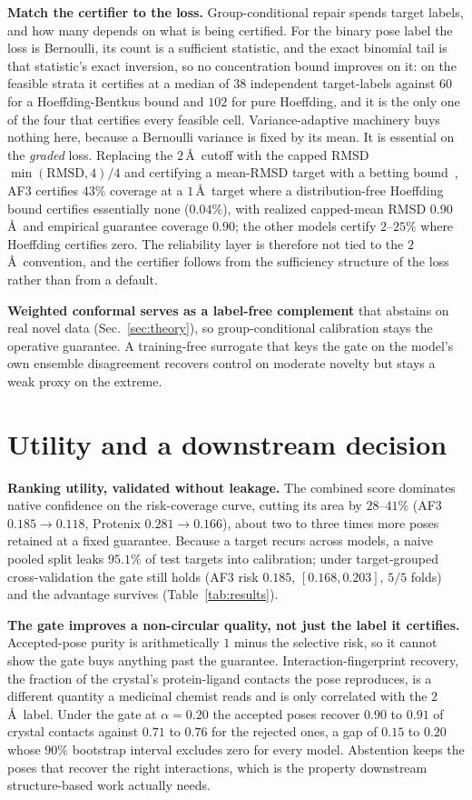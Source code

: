 \documentclass[10pt]{article}
\begin{document}
\textbf{Match the certifier to the loss.} Group-conditional repair spends target labels, and how
many depends on what is being certified. For the binary pose label the loss is Bernoulli, its count
is a sufficient statistic, and the exact binomial tail is that statistic's exact inversion, so no
concentration bound improves on it: on the feasible strata it certifies at a median of $38$
independent target-labels against $60$ for a Hoeffding-Bentkus bound and $102$ for pure Hoeffding,
and it is the only one of the four that certifies every feasible cell. Variance-adaptive machinery
buys nothing here, because a Bernoulli variance is fixed by its mean. It is essential on the
\emph{graded} loss. Replacing the $2$\,\AA\ cutoff with the capped RMSD $\min(\mathrm{RMSD},4)/4$ and
certifying a mean-RMSD target with a betting bound~\citep{waudbysmith2024betting}, AF3 certifies
$43\%$ coverage at a $1$\,\AA\ target where a distribution-free Hoeffding bound certifies essentially
none ($0.04\%$), with realized capped-mean RMSD $0.90$\,\AA\ and empirical guarantee coverage $0.90$;
the other models certify $2$--$25\%$ where Hoeffding certifies zero. The reliability layer is
therefore not tied to the $2$\,\AA\ convention, and the certifier follows from the sufficiency
structure of the loss rather than from a default.

\textbf{Weighted conformal serves as a label-free complement} that abstains on real novel data
(Sec.~\ref{sec:theory}), so group-conditional calibration stays the operative guarantee. A
training-free surrogate that keys the gate on the model's own ensemble disagreement recovers control
on moderate novelty but stays a weak proxy on the extreme.

\section{Utility and a downstream decision}\label{sec:screen}
\textbf{Ranking utility, validated without leakage.} The combined score dominates native
confidence on the risk-coverage curve, cutting its area by $28$--$41\%$ (AF3
$0.185\!\to\!0.118$, Protenix $0.281\!\to\!0.166$), about two to three times more poses
retained at a fixed guarantee. Because a target recurs across models, a naive pooled split
leaks $95.1\%$ of test targets into calibration; under target-grouped cross-validation the gate
still holds (AF3 risk $0.185$, $[0.168,0.203]$, $5/5$ folds) and the advantage survives
(Table~\ref{tab:results}).

\textbf{The gate improves a non-circular quality, not just the label it certifies.} Accepted-pose
purity is arithmetically $1$ minus the selective risk, so it cannot show the gate buys anything past
the guarantee. Interaction-fingerprint recovery, the fraction of the crystal's protein-ligand
contacts the pose reproduces, is a different quantity a medicinal chemist reads and is only
correlated with the $2$\,\AA\ label. Under the gate at $\alpha=0.20$ the accepted poses recover $0.90$
to $0.91$ of crystal contacts against $0.71$ to $0.76$ for the rejected ones, a gap of $0.15$ to
$0.20$ whose $90\%$ bootstrap interval excludes zero for every model. Abstention keeps the poses that
recover the right interactions, which is the property downstream structure-based work actually needs.
\end{document}

